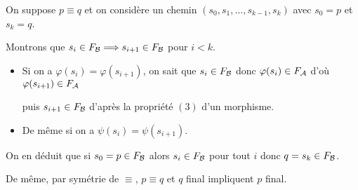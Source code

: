 \begin{Exercise}[label=ques:final]
On suppose $p\equiv q$ et on considère un chemin $(s_0, s_1, \ldots, s_{k-1}, s_k)$ avec $s_0=p$ et $s_k=q$.

Montrons que $s_i\in F_{\cal B} \Longrightarrow s_{i+1} \in F_{\cal B}$ pour $i< k$.
\begin{itemize}
  \item Si on a $\varphi(s_i) = \varphi(s_{i+1})$, on sait que $s_i\in F_{\cal B}$ donc $\varphi(s_i)\in F_{\cal A}$ d'où $\varphi(s_{i+1})\in F_{\cal A}$ 
  
  puis $s_{i+1} \in F_{\cal B}$ d'après la propriété $(3)$ d'un morphisme.
  \item De même si on a $\psi(s_i) = \psi(s_{i+1})$.
\end{itemize}

On en déduit que si $s_0 = p\in F_{\cal B}$ alors $s_i\in F_{\cal B}$ pour tout $i$ donc $q = s_k\in F_{\cal B}$.

De même, par symétrie de $\equiv$, $p\equiv q$ et $q$ final impliquent $p$ final.
\end{Exercise}
